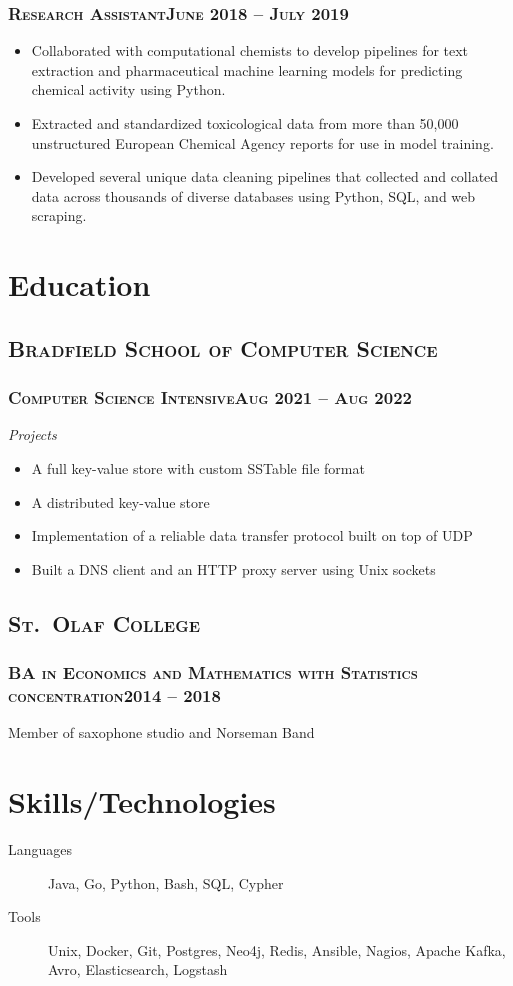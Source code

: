 \documentclass{article}
\newcommand{\resumeSection}[1]{\section*{#1}}
\newcommand{\institution}[1]{\subsection*{\scshape{#1}}}
\newcommand{\jobPosition}[3]{\subsubsection*{\scshape{#1}\hfill #2 -- #3}}
\begin{document}
    \jobPosition{Research Assistant}{June 2018}{July 2019}
    \begin{itemize}[noitemsep]
      \item
            Collaborated with computational chemists to develop
            pipelines for text extraction and pharmaceutical machine
            learning models for predicting chemical activity using Python.
      \item
            Extracted and standardized toxicological data from more
            than 50,000 unstructured European Chemical Agency reports
            for use in model training.
      \item
            Developed several unique data cleaning pipelines that
            collected and collated data across thousands of diverse
            databases using Python, SQL, and web scraping.
    \end{itemize}

\resumeSection{Education}
  \institution{Bradfield School of Computer Science}
    \jobPosition{Computer Science Intensive}{Aug 2021}{Aug 2022}
    \emph{Projects}
    \begin{itemize}[noitemsep]
      \item A full key-value store with custom SSTable file format
      \item A distributed key-value store
      \item Implementation of a reliable data transfer protocol built on top of UDP
      \item Built a DNS client and an HTTP proxy server using Unix sockets
    \end{itemize}

  \institution{St.\ Olaf College}
    \jobPosition{BA in Economics and Mathematics with Statistics concentration}{2014}{2018}
    Member of saxophone studio and Norseman Band

\resumeSection{Skills/Technologies}
  \begin{description}
          \item [Languages]
    Java,
    Go,
    Python,
    Bash,
    SQL,
    Cypher
          \item [Tools]
    Unix,
    Docker,
    Git,
    Postgres,
    Neo4j,
    Redis,
    Ansible,
    Nagios,
    Apache Kafka,
    Avro,
    Elasticsearch,
    Logstash
  \end{description}
\end{document}
